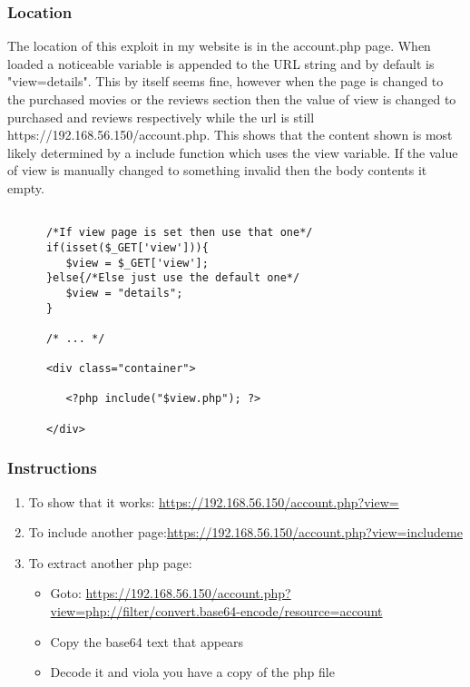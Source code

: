 \documentclass[titlepage]{article}
\begin{document}

      \subsubsection{Location} %
      \label{ssub:php_file_include_location}
      
      The location of this exploit in my website is in the account.php page. When loaded a noticeable variable is appended to the URL string and by default is "view=details". This by itself seems fine, however when the page is changed to the purchased movies or the reviews section then the value of view is changed to purchased and reviews respectively while the url is still https://192.168.56.150/account.php. This shows that the content shown is most likely determined by a include function which uses the view variable. If the value of view is manually changed to something invalid then the body contents it empty.

      \begin{lstlisting}

      /*If view page is set then use that one*/
      if(isset($_GET['view'])){
         $view = $_GET['view'];
      }else{/*Else just use the default one*/
         $view = "details";
      }

      /* ... */

      <div class="container">
         
         <?php include("$view.php"); ?>

      </div>

      \end{lstlisting}


      \subsubsection{Instructions} %
      \label{ssub:php_file_include_instructions}
      
      \begin{enumerate}
         \item To show that it works: \url{https://192.168.56.150/account.php?view=}
         \item To include another page:\url{https://192.168.56.150/account.php?view=includeme}
         \item To extract another php page:
         \begin{itemize}
            \item Goto: \url{https://192.168.56.150/account.php?view=php://filter/convert.base64-encode/resource=account}
            \item Copy the base64 text that appears
            \item Decode it and viola you have a copy of the php file
         \end{itemize}
      \end{enumerate}
\end{document}
